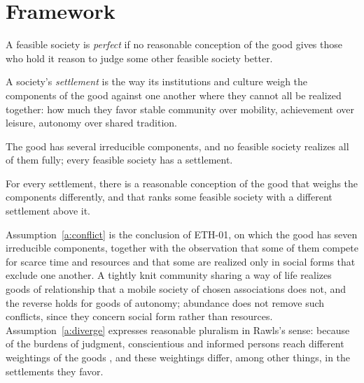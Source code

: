 \documentclass{situationist-preprint}
\begin{document}
\section{Framework}

\begin{definition}\label{d:perfect}
A feasible society is \emph{perfect} if no reasonable conception of the good gives those who hold it reason to judge some other feasible society better.
\end{definition}

\begin{definition}[Settlement]\label{d:settlement}
A society's \emph{settlement} is the way its institutions and culture weigh the components of the good against one another where they cannot all be realized together: how much they favor stable community over mobility, achievement over leisure, autonomy over shared tradition.
\end{definition}

\begin{assumption}\label{a:conflict}
The good has several irreducible components, and no feasible society realizes all of them fully; every feasible society has a settlement.
\end{assumption}

\begin{assumption}\label{a:diverge}
For every settlement, there is a reasonable conception of the good that weighs the components differently, and that ranks some feasible society with a different settlement above it.
\end{assumption}

Assumption~\ref{a:conflict} is the conclusion of ETH-01, on which the good has seven irreducible components, together with the observation that some of them compete for scarce time and resources and that some are realized only in social forms that exclude one another. A tightly knit community sharing a way of life realizes goods of relationship that a mobile society of chosen associations does not, and the reverse holds for goods of autonomy; abundance does not remove such conflicts, since they concern social form rather than resources. Assumption~\ref{a:diverge} expresses reasonable pluralism in Rawls's sense: because of the burdens of judgment, conscientious and informed persons reach different weightings of the goods \citep[Lecture~II]{Rawls1993}, and these weightings differ, among other things, in the settlements they favor.
\end{document}
